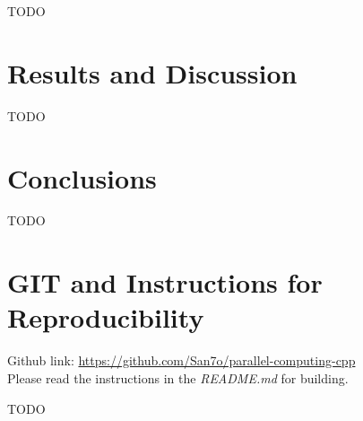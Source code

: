 \documentclass[conference]{IEEEtran}
\begin{document}
\iffalse
- Detailed description of the computing system and platform. \\
- Relevant specifications or configurations (e.g., libraries
and programming toolchains). \\
- Description of the experimental setup, procedures, and
methodologies used in the project. \\
- Discussion on how experiments are designed to test the hypotheses
or achieve the objectives \\
\fi

TODO

\section{Results and Discussion}

\iffalse
- Presentation of results \\
- Analysis and interpretation in context \\
- Comparison with the state-of-the-art \\
\fi

TODO

\section{Conclusions}

\iffalse
- Summary of the key findings and contributions
\fi 

TODO

\section{GIT and Instructions for Reproducibility}

Github link: \href{https://github.com/San7o/parallel-computing-cpp}{https://github.com/San7o/parallel-computing-cpp} \\
Please read the instructions in the \textit{README.md} for building.

\begin{thebibliography}{00}
 TODO
\end{thebibliography}
\vspace{12pt}
\end{document}
